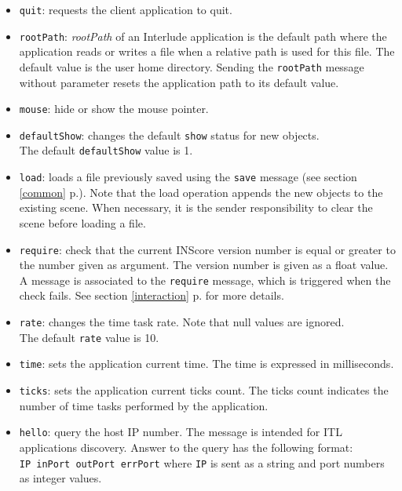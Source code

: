 \documentclass[a4paper,twoside]{report}
\newcommand{\fullref}[1]	{\ref{#1} p.\pageref{#1}}
\newcommand{\OSC}[1]		{\texttt{#1}}
\newcommand{\oldexample}		{\hspace*{1cm}}
\begin{document}
\begin{itemize}
\item \OSC{quit}: requests the client application to quit.

\item \OSC{rootPath}: \emph{rootPath} of an Interlude application is the default path where the application reads or writes a file when a relative path is used for this file. The default value is the user home directory. Sending the \OSC{rootPath} message without parameter resets the application path to its default value.

\item \OSC{mouse}: hide or show the mouse pointer.

\item \OSC{defaultShow}: changes the default \OSC{show} status for new objects. \\
The default \OSC{defaultShow} value is 1.

\item \OSC{load}: loads a file previously saved using the \OSC{save} message (see section \fullref{common}). Note that the load operation appends the new objects to the existing scene. When necessary, it is the sender responsibility to clear the scene before loading a file.

\item \OSC{require}: check that the current INScore version number is equal or greater to the number given as argument. The version number is given as a float value. A message is associated to the \OSC{require} message, which is triggered when the check fails. See section \fullref{interaction} for more details.

\item \OSC{rate}: changes the time task rate. Note that null values are ignored.\\
The default \OSC{rate} value is 10.

\item \OSC{time}: sets the application current time. The time is expressed in milliseconds.

\item \OSC{ticks}: sets the application current ticks count. The ticks count indicates the number of time tasks performed by the application.

\item \OSC{hello}: query the host IP number. The message is intended for ITL applications discovery. Answer to the query has the following format: \\
\oldexample \OSC{IP  inPort outPort errPort} where \OSC{IP} is sent as a string and port numbers as integer values.

\end{itemize}
\end{document}

